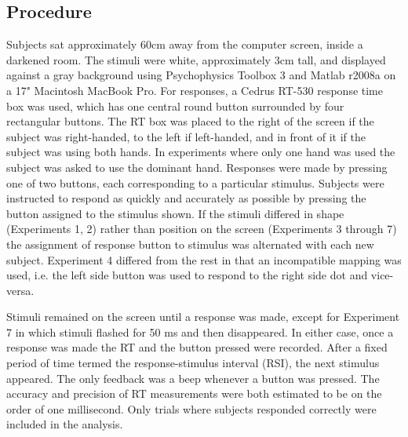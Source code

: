 \documentclass{apa}[12pt]
\begin{document}

\subsection{Procedure}

Subjects sat approximately 60cm away from the computer screen, inside a darkened room. The stimuli were white, approximately 3cm tall, and displayed against a gray background using Psychophysics Toolbox 3 and Matlab r2008a on a 17" Macintosh MacBook Pro. For responses, a Cedrus RT-530 response time box was used, which has one central round button surrounded by four rectangular buttons. The RT box was placed to the right of the screen if the subject was right-handed, to the left if left-handed, and in front of it if the subject was using both hands. In experiments where only one hand was used the subject was asked to use the dominant hand. Responses were made by pressing one of two buttons, each corresponding to a particular stimulus. Subjects were instructed to respond as quickly and accurately as possible by pressing the button assigned to the stimulus shown. If the stimuli differed in shape (Experiments 1, 2) rather than position on the screen (Experiments 3 through 7) the assignment of response button to stimulus was alternated with each new subject. Experiment 4 differed from the rest in that an incompatible mapping was used, i.e. the left side button was used to respond to the right side dot and vice-versa.

Stimuli remained on the screen until a response was made, except for Experiment 7 in which stimuli flashed for 50 ms and then disappeared. In either case, once a response was made the RT and the button pressed were recorded. After a fixed period of time termed the response-stimulus interval (RSI), the next stimulus appeared. The only feedback was a beep whenever a button was pressed. The accuracy and precision of RT measurements were both estimated to be on the order of one millisecond. Only trials where subjects responded correctly were included in the analysis.
\end{document}
